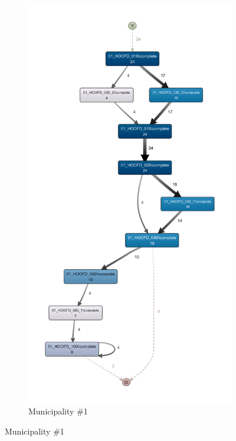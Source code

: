 \begin{figure}
\centering
  \begin{subfigure}[t]{.4\textwidth}
    \centering
    \includegraphics[width=1\linewidth]{5_results_discussions/coselog-wabo/coselog-wabo-1-simplified}
    \caption{Municipality \#1}
    \label{fig:coselog-wabo-process-models-simplified-1}

\end{subfigure}
\end{figure}
